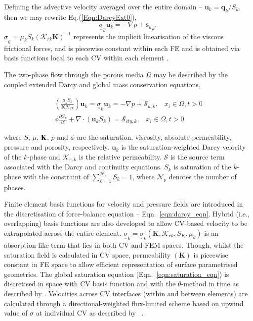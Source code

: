 \documentclass[preprint,authoryear,12pt]{elsarticle}
\begin{document}
 Defining the advective velocity averaged over the entire domain -- $\mathbf{u}_{k}= \mathbf{q}_{k}/S_{k}$, then we may rewrite Eq.(\ref{Eqn:DarcyExt0}),
\begin{equation}
  {\underline {\underline \sigma}}_{k} \mathbf{u}_{k} = - \nabla p + {\mathbf{s}_{u}}_{k},
  \label{Eqn:DarcyExt}
\end{equation}
$\underline{\underline{\sigma}}_{k}=\mu_{k}S_{k}\left(\mathcal{K}_{rk}\mathbf{K}\right)^{-1}$ represents the implicit linearisation of the viscous frictional forces, and is piecewise constant within each FE and is obtained via basis functions local to each CV within each element \citep{Jackson13,Radunz14}.

The two-phase flow through the porous media $\Omega$ may be described by the coupled extended Darcy and global mass conservation equations,

\begin{eqnarray}
\left(\displaystyle\frac{\mu_{k}S_{k}}{{\mathbf K}\mathcal{K}_{rk}}\right) {\mathbf u}_{k} = \underline{\underline{\sigma}}_{k} {\mathbf u}_{k} = -\nabla p + \mathcal{S}_{u,k},\;\;\; x_{i}\in\Omega, t>0 \label{eqn:darcy_eqn} \\
\phi\displaystyle\frac{\partial S_{k} }{\partial t} +   \nabla \cdot \left( {\mathbf u}_{k}  S_{k}\right) =  \mathcal{S}_{cty,k},\;\;\; x_{i}\in\Omega, t>0\label{eqn:saturation_eqn}
\end{eqnarray}

where $S$, $\mu$, ${\bf K}$, $p$ and $\phi$ are the saturation, viscosity, absolute permeability, pressure and porosity, respectively. ${\mathbf u}_{k}$ is the saturation-weighted Darcy velocity of the $k$-phase and $\mathcal{K}_{r,k}$ is the relative permeability. $\mathcal{S}$ is the source term associated with the Darcy and continuity equations. $S_{k}$ is saturation of the $k$-phase with the constraint of $\sum\limits_{k=1}^{\mathcal{N}_{p}} S_{k} = 1$, where $\mathcal{N}_{p}$ denotes the number of phases.

Finite element basis functions for velocity and pressure fields are introduced in the discretisation of force-balance equation -- Eqn.~\ref{eqn:darcy_eqn}. Hybrid (i.e., overlapping) basis functions are also developed to allow CV-based velocity to be extrapolated across the entire element. $\underline{\underline{\sigma}}_{k}=\underline{\underline{\sigma}}_{k}\left({\mathbf K}, \mathcal{K}_{rk}, S_{K}, \mu_{k}\right)$ is an absorption-like term that lies in both CV and FEM spaces. Though, whilst the saturation field is calculated in CV space, permeability $\left({\mathbf K}\right)$ is piecewise constant in FE space to allow efficient representation of surface parametrised geometries. The global saturation equation (Eqn.~\ref{eqn:saturation_eqn}) is discretised in space with CV basis function and with the $\theta$-method in time as described by \citet{gomes_book_2012}. Velocities across CV interfaces (within and between elements) are calculated through a directional-weighted flux-limited scheme based on upwind value of $\sigma$ at individual CV as described by \citet{gomes_2013}~\citep[see also][]{jackson_2013}.
\end{document}
